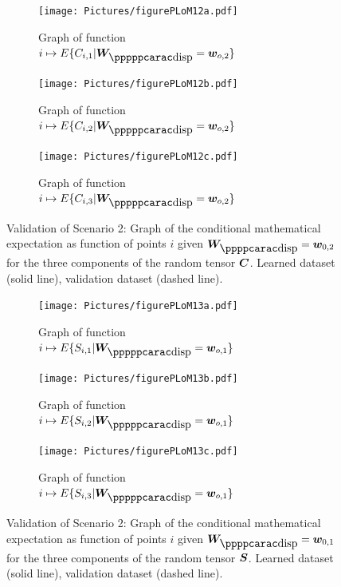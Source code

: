 \begin{figure}[!htb]
    \centering
    \begin{subfigure}[b]{0.33\textwidth}
    \centering
        \texttt{[image: Pictures/figurePLoM12a.pdf]}
        \caption{Graph of function $i\mapsto E\{ C_{i,1} \vert \bfW_\disppp = \bfw_{o,2} \}$}
        \label{fig:figurePLoM12a}
    \end{subfigure}
    \centering
    \begin{subfigure}[b]{0.33\textwidth}
    \centering
        \texttt{[image: Pictures/figurePLoM12b.pdf]}
        \caption{Graph of function $i\mapsto E\{ C_{i,2} \vert \bfW_\disppp = \bfw_{o,2} \}$}
        \label{fig:figurePLoM12b}
    \end{subfigure}
    \centering
    \begin{subfigure}[b]{0.33\textwidth}
    \centering
        \texttt{[image: Pictures/figurePLoM12c.pdf]}
        \caption{Graph of function $i\mapsto E\{ C_{i,3} \vert \bfW_\disppp = \bfw_{o,2} \}$}
        \label{fig:figurePLoM12c}
    \end{subfigure}
    \caption{Validation of Scenario 2: Graph of the conditional mathematical expectation as function of points $i$ given $\bfW_\dispp =\bfw_{0,2}$ for the three components of the random tensor ${\boldsymbol{C}}$.  Learned dataset (solid line), validation dataset (dashed line).}
    \label{fig:figurePLoM12}
\end{figure}
%
\begin{figure}[!htb]
    \centering
    \begin{subfigure}[b]{0.33\textwidth}
    \centering
        \texttt{[image: Pictures/figurePLoM13a.pdf]}
        \caption{Graph of function $i\mapsto E\{ S_{i,1} \vert \bfW_\disppp = \bfw_{o,1} \}$}
        \label{fig:figurePLoM13a}
    \end{subfigure}
    \centering
    \begin{subfigure}[b]{0.33\textwidth}
    \centering
        \texttt{[image: Pictures/figurePLoM13b.pdf]}
        \caption{Graph of function $i\mapsto E\{ S_{i,2} \vert \bfW_\disppp = \bfw_{o,1} \}$}
        \label{fig:figurePLoM13b}
    \end{subfigure}
    \centering
    \begin{subfigure}[b]{0.33\textwidth}
    \centering
        \texttt{[image: Pictures/figurePLoM13c.pdf]}
        \caption{Graph of function $i\mapsto E\{ S_{i,3} \vert \bfW_\disppp = \bfw_{o,1} \}$}
        \label{fig:figurePLoM13c}
    \end{subfigure}
    \caption{Validation of Scenario 2: Graph of the conditional mathematical expectation as function of points $i$ given $\bfW_\dispp =\bfw_{0,1}$ for the three components of the random tensor ${\boldsymbol{S}}$.  Learned dataset (solid line), validation dataset (dashed line).}
    \label{fig:figurePLoM13}
\end{figure}
